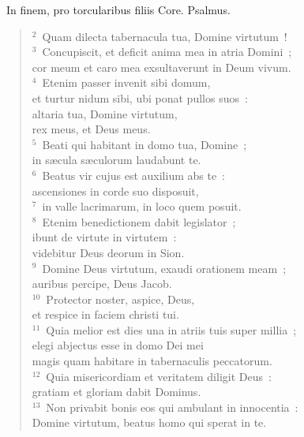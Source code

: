 ~\lettrine[lines=10,image=true,loversize=0.05,lraise=-0.03]{I}{}n finem, pro torcularibus filiis Core. Psalmus.
\begin{flushleft}\begin{verse}\vspace{6pt}${}^{2}$~Quam dilecta tabernacula tua, Domine virtutum~!\\
${}^{3}$~Concupiscit, et deficit anima mea in atria Domini~;\\ cor meum et caro mea exsultaverunt in Deum vivum.\\
${}^{4}$~Etenim passer invenit sibi domum,\\ et turtur nidum sibi, ubi ponat pullos suos~:\\ altaria tua, Domine virtutum,\\ rex meus, et Deus meus.\\
${}^{5}$~Beati qui habitant in domo tua, Domine~;\\ in s\ae cula s\ae culorum laudabunt te.\\
${}^{6}$~Beatus vir cujus est auxilium abs te~:\\ ascensiones in corde suo disposuit,\\
${}^{7}$~in valle lacrimarum, in loco quem posuit.\\
${}^{8}$~Etenim benedictionem dabit legislator~;\\ ibunt de virtute in virtutem~:\\ videbitur Deus deorum in Sion.\\
${}^{9}$~Domine Deus virtutum, exaudi orationem meam~;\\ auribus percipe, Deus Jacob.\\
${}^{10}$~Protector noster, aspice, Deus,\\ et respice in faciem christi tui.\\
${}^{11}$~Quia melior est dies una in atriis tuis super millia~;\\ elegi abjectus esse in domo Dei mei\\ magis quam habitare in tabernaculis peccatorum.\\
${}^{12}$~Quia misericordiam et veritatem diligit Deus~:\\ gratiam et gloriam dabit Dominus.\\
${}^{13}$~Non privabit bonis eos qui ambulant in innocentia~:\\ Domine virtutum, beatus homo qui sperat in te.\end{verse}\end{flushleft}


